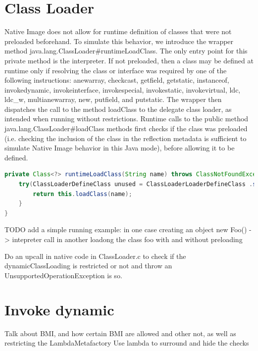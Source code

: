 \section{Class Loader}
Native Image does not allow for runtime definition of classes that were not preloaded beforehand.
To simulate this behavior, we introduce the wrapper method java.lang.ClassLoader#runtimeLoadClass. The only entry point for this private method is the interpreter. If not preloaded, then a class may be defined at runtime only if resolving the class or interface was required by one of the following instructions:
anewarray, checkcast, getfield, getstatic, instanceof, invokedynamic, invokeinterface, invokespecial,
invokestatic, invokevirtual, ldc, ldc\_w, multianewarray, new, putfield, and putstatic.
The wrapper then dispatches the call to the method loadClass to the delegate class loader, as intended when running without restrictions.
Runtime calls to the public method java.lang.ClassLoader#loadClass methods first checks if the class was preloaded (i.e. checking the inclusion of the class in the reflection metadata is sufficient to simulate Native Image behavior in this Java mode), before allowing it to be defined.

\begin{lstlisting}[language=Java]
private Class<?> runtimeLoadClass(String name) throws ClassNotFoundException {
    try(ClassLoaderDefineClass unused = ClassLoaderLoaderDefineClass .setIsRuntimeDefineClassAllowed()) {
        return this.loadClass(name);
    }
}
\end{lstlisting}

TODO add a simple running example: in one case creating an object new Foo() -> intepreter call
in another loadong the class foo with and without preloading

Do an upcall in native code in ClassLoader.c to check if the dynamicClassLoading is restricted or not and throw an UnsupportedOperationException is so.

\section{Invoke dynamic}
Talk about BMI, and how certain BMI are allowed and other not, as well as restricting the LambdaMetafactory
Use lambda to surround and hide the checks


